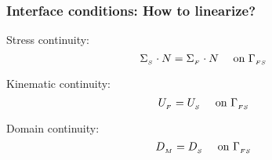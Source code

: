 \begin{frame} 
  \frametitle{Interface conditions: How to linearize?}
\begin{figure}[htbp]
  \def\svgwidth{0.3\columnwidth}
  
\end{figure}
  
  Stress continuity:
  \begin{equation*} \label{eq:continuity,stress}
    \Sigma_{_{S}} \cdot N = \Sigma_{_{F}} \cdot N
    \quad \text{ on } \Gamma_{_{FS}}
  \end{equation*}

  Kinematic continuity:
  \begin{equation*} \label{eq:continuity, kinematic}
    U_{_{F}} = U_{_{S}}
    \quad \text{ on } \Gamma_{_{FS}}
  \end{equation*}

  Domain continuity:
  \begin{equation*} \label{eq:continuity, domain}
    D_{_{M}} = D_{_{S}}
    \quad \text{ on } \Gamma_{_{FS}}
  \end{equation*}
\end{frame}
